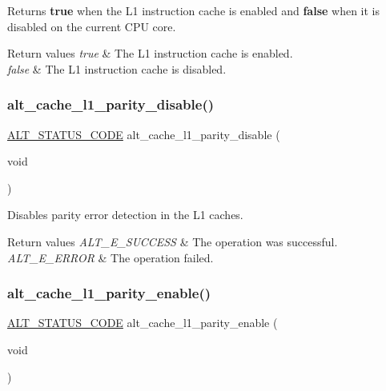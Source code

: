 Returns {\bfseries{true}} when the L1 instruction cache is enabled and {\bfseries{false}} when it is disabled on the current C\+PU core.


\begin{DoxyRetVals}{Return values}
{\em true} & The L1 instruction cache is enabled. \\
\hline
{\em false} & The L1 instruction cache is disabled. \\
\hline
\end{DoxyRetVals}
\mbox{\label{group__CACHE__L1_ga5ccd83744fcb82e586c02f0d959a35a5}} 
\subsubsection{\texorpdfstring{alt\_cache\_l1\_parity\_disable()}{alt\_cache\_l1\_parity\_disable()}}
{\footnotesize\ttfamily \mbox{\hyperlink{hwlib_8h_abdb0d369f069723ca55d6c94bcaaaa12}{A\+L\+T\+\_\+\+S\+T\+A\+T\+U\+S\+\_\+\+C\+O\+DE}} alt\+\_\+cache\+\_\+l1\+\_\+parity\+\_\+disable (\begin{DoxyParamCaption}\item[{void}]{ }\end{DoxyParamCaption})}

Disables parity error detection in the L1 caches.


\begin{DoxyRetVals}{Return values}
{\em A\+L\+T\+\_\+\+E\+\_\+\+S\+U\+C\+C\+E\+SS} & The operation was successful. \\
\hline
{\em A\+L\+T\+\_\+\+E\+\_\+\+E\+R\+R\+OR} & The operation failed. \\
\hline
\end{DoxyRetVals}
\mbox{\label{group__CACHE__L1_ga53e8125772688d09fefba728efc544e2}} 
\subsubsection{\texorpdfstring{alt\_cache\_l1\_parity\_enable()}{alt\_cache\_l1\_parity\_enable()}}
{\footnotesize\ttfamily \mbox{\hyperlink{hwlib_8h_abdb0d369f069723ca55d6c94bcaaaa12}{A\+L\+T\+\_\+\+S\+T\+A\+T\+U\+S\+\_\+\+C\+O\+DE}} alt\+\_\+cache\+\_\+l1\+\_\+parity\+\_\+enable (\begin{DoxyParamCaption}\item[{void}]{ }\end{DoxyParamCaption})}

